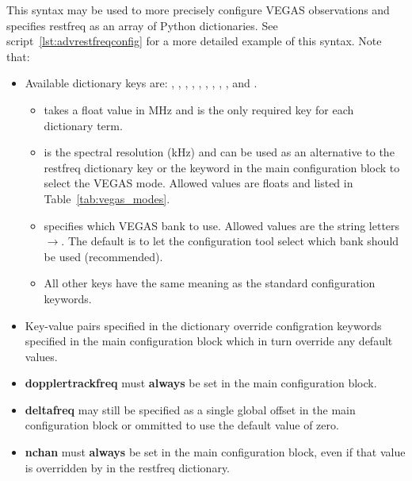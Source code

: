 \begin{description}[leftmargin=*,font=\bfseries\large]
\begin{enumerate}[label=\bfseries{\arabic*.},leftmargin=*]
This syntax may be used to more precisely configure \gls{VEGAS} observations and
specifies restfreq as an array of Python dictionaries.  See script~\ref{lst:advrestfreqconfig}
for a more detailed example of this syntax.  Note that:

\begin{itemize}
\item Available dictionary keys are: , ,
, , , , ,
, , and .
\begin{itemize}[itemsep=0pt]
\item {} takes a float value in MHz and is the only required key for
each dictionary term.
\item {} is the spectral resolution (kHz) and can be used as an alternative
to the  restfreq dictionary key or the  keyword in the main
configuration block to select the \gls{VEGAS} mode. Allowed values are floats and
listed in Table~\ref{tab:vegas_modes}.
\item {} specifies which \gls{VEGAS} bank to use.  Allowed values are the
string letters $\rightarrow$.  The default is to let the configuration tool
select which bank should be used (recommended).
\item All other keys have the same meaning as the standard configuration keywords.
\end{itemize}

\item Key-value pairs specified in the dictionary override configration keywords specified
in the main configuration block which in turn override any default values.
\item {\bf dopplertrackfreq} must {\bf always} be set in the main configuration block.
\item {\bf deltafreq} may still be specified as a single global offset in the main
configuration block or ommitted to use the default value of zero.
\item {\bf nchan} must {\bf always} be set in the main configuration block, even if that
value is overridden by  in the restfreq dictionary.
\end{itemize}

\end{enumerate}

\end{description}
\newpage

